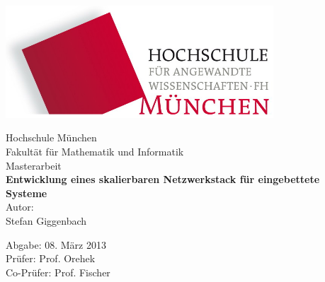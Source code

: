 %
\begin{flushright}
\includegraphics[width=0.75\textwidth]{img/hm.jpg}%
\end{flushright}


\vspace*{20mm}
\begin{center}
{\Large Hochschule München}\\
{\large Fakultät für Mathematik und Informatik}\\

\vspace*{15mm}
{\huge Masterarbeit }
\\

\vspace*{10mm}
{\huge \bfseries{ Entwicklung eines skalierbaren Netzwerkstack für eingebettete Systeme }} 
\\
\vspace*{15mm}
{\Large Autor: \\
Stefan Giggenbach
} 
\\
\end{center}

\vfill
{\large
Abgabe: 08. März 2013\\
Prüfer: Prof. Orehek\\
Co-Prüfer: Prof. Fischer}

\thispagestyle{empty}
\clearpage

\tableofcontents

\thispagestyle{empty}
\clearpage

